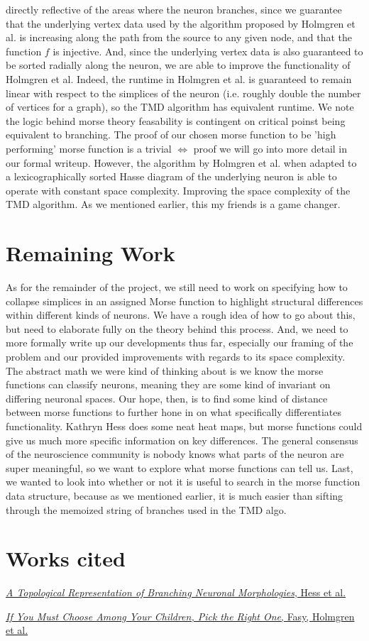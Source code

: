 \documentclass[11pt]{article}
\begin{document}
\begin{enumerate}
		directly reflective of the areas where the neuron branches, since we guarantee that the underlying vertex data
		used by the algorithm proposed by Holmgren et al. is increasing along the path from the source to any given node, and that the function
		$f$ is injective. And, since the underlying vertex data is also guaranteed to be sorted radially along the neuron, we are able
		to improve the functionality of Holmgren et al. Indeed, the runtime in Holmgren et al. is guaranteed to remain linear with respect
		to the simplices of the neuron (i.e. roughly double the number of vertices for a graph), so the TMD algorithm has equivalent runtime.
		We note the logic behind morse theory feasability is contingent on critical poinst being equivalent to branching. 
		The proof of our chosen morse function to be 'high performing' morse function is a trivial $\iff$ proof we will go into more detail in 
		our formal writeup. 
		However, the algorithm by Holmgren et al. when adapted to a lexicographically sorted Hasse diagram of the underlying neuron
		is able to operate with constant space complexity. Improving the space complexity of the TMD algorithm.
		As we mentioned earlier, this my friends is a game changer.
\end{enumerate}

\section*{Remaining Work}
As for the remainder of the project, we still need to work on specifying how to collapse simplices in an assigned Morse function to highlight
structural differences within different kinds of neurons. We have a rough idea of how to go about this, but need to elaborate fully on
the theory behind this process. And, we need to more formally write up our developments thus far, especially our framing of the problem
and our provided improvements with regards to its space complexity.
The abstract math we were kind of thinking about is we know the morse functions
can classify neurons, meaning they are some kind of invariant on differing 
neuronal spaces. Our hope, then, is to find some kind of distance between 
morse functions to further hone in on what specifically differentiates
functionality. Kathryn Hess does some neat heat maps, but morse functions could
give us much more specific information on key differences. The general consensus
of the neuroscience community is nobody knows what parts of the neuron are 
super meaningful, so we want to explore what morse functions can tell us.
Last, we wanted to look into whether or not it is useful to search in the morse
function data structure, because as we mentioned earlier, it is much easier than
sifting through the memoized string of branches used in the TMD algo.

\section*{Works cited}
\href{hess.pdf}{\textit{A Topological Representation of Branching Neuronal Morphologies}, Hess et al.}

\href{cccg20.pdf}{\textit{If You Must Choose Among Your Children, Pick the Right One}, Fasy, Holmgren et al.}
\end{document}
